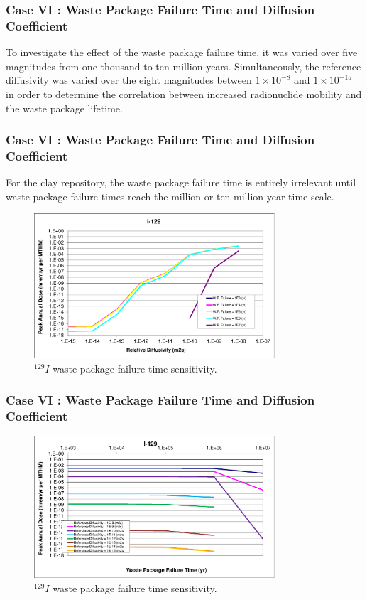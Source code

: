 \begin{frame}[c]
  \frametitle{Case VI : Waste Package Failure Time and Diffusion Coefficient}

To investigate the effect of the waste package failure time, it was varied over 
five magnitudes from one thousand to ten million years. Simultaneously, the reference 
diffusivity was varied over the eight magnitudes between $1\times10^{-8}$ and 
$1\times10^{-15}$ in order to determine the correlation between increased 
radionuclide mobility and the waste package lifetime. 

\end{frame}

\begin{frame}[c]
  \frametitle{Case VI : Waste Package Failure Time and Diffusion Coefficient}

For the clay repository, the waste package failure time is entirely irrelevant 
until waste package failure times reach the million or ten million year time 
scale. 

\begin{figure}[ht!]
\centering
\includegraphics[width=0.8\textwidth]{WPFailExtended/I-129.eps}
\caption{$^{129}I$ waste package failure time sensitivity. }
\label{fig:WPFailI129}
\end{figure}
\end{frame}

\begin{frame}[c]
  \frametitle{Case VI : Waste Package Failure Time and Diffusion Coefficient}

\begin{figure}[ht!]
\centering
\includegraphics[width=0.8\textwidth]{WPFailExtended/I-129-WPFail.eps}
\caption{$^{129}I$ waste package failure time sensitivity. }
\label{fig:WPFailI129}
\end{figure}
\end{frame}


